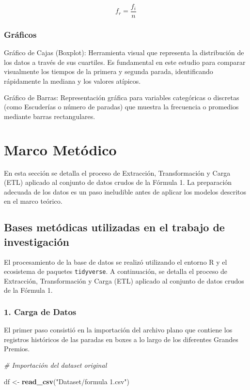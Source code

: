 \documentclass[oneside,11pt]{Latex/Classes/PhDthesisPSnPDF}
\newenvironment{Shaded}{\begin{snugshade}}{\end{snugshade}}
\newcommand{\CommentTok}[1]{\textcolor[rgb]{0.56,0.35,0.01}{\textit{#1}}}
\newcommand{\FunctionTok}[1]{\textcolor[rgb]{0.13,0.29,0.53}{\textbf{#1}}}
\newcommand{\NormalTok}[1]{#1}
\newcommand{\OtherTok}[1]{\textcolor[rgb]{0.56,0.35,0.01}{#1}}
\newcommand{\StringTok}[1]{\textcolor[rgb]{0.31,0.60,0.02}{#1}}
\begin{document}
\[ f_r = \frac{f_i}{n} \]

\subsection{Gráficos}

Gráfico de Cajas (Boxplot): Herramienta visual que representa la
distribución de los datos a través de sus cuartiles. Es fundamental en
este estudio para comparar visualmente los tiempos de la primera y
segunda parada, identificando rápidamente la mediana y los valores
atípicos.

Gráfico de Barras: Representación gráfica para variables categóricas o
discretas (como Escuderías o número de paradas) que muestra la
frecuencia o promedios mediante barras rectangulares.

\chapter{Marco Metódico}

En esta sección se detalla el proceso de Extracción, Transformación y
Carga (ETL) aplicado al conjunto de datos crudos de la Fórmula 1. La
preparación adecuada de los datos es un paso ineludible antes de aplicar
los modelos descritos en el marco teórico.

\section{Bases metódicas utilizadas en el trabajo de investigación}

El procesamiento de la base de datos se realizó utilizando el entorno R
y el ecosistema de paquetes \texttt{tidyverse}. A continuación, se
detalla el proceso de Extracción, Transformación y Carga (ETL) aplicado
al conjunto de datos crudos de la Fórmula 1.\\

\subsection{1. Carga de Datos}

El primer paso consistió en la importación del archivo plano que
contiene los registros históricos de las paradas en boxes a lo largo de
los diferentes Grandes Premios.

\begin{Shaded}
\begin{Highlighting}[]
\CommentTok{\# Importación del dataset original}

\NormalTok{df }\OtherTok{\textless{}{-}} \FunctionTok{read\_csv}\NormalTok{(}\StringTok{"Dataset/formula 1.csv"}\NormalTok{)}
\end{Highlighting}
\end{Shaded}
\end{document}
